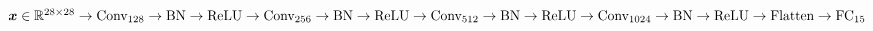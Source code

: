 $\vect{x} \in \real^{28 \times 28} \newline
	\rightarrow \text{Conv}_{128} \rightarrow \text{BN} \rightarrow \text{ReLU} \newline
	\rightarrow \text{Conv}_{256} \rightarrow \text{BN} \rightarrow \text{ReLU} \newline
	\rightarrow \text{Conv}_{512} \rightarrow \text{BN} \rightarrow \text{ReLU} \newline
	\rightarrow \text{Conv}_{1024} \rightarrow \text{BN} \rightarrow \text{ReLU} \newline
	\rightarrow \text{Flatten} \rightarrow \text{FC}_{15}$